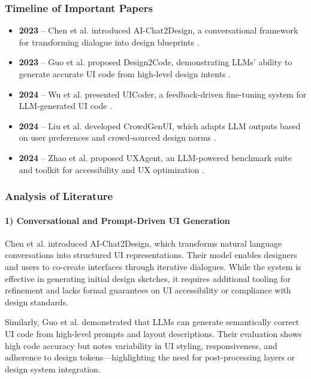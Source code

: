 \documentclass[12pt]{article}
\begin{document}
\subsubsection{Timeline of Important Papers}

\begin{itemize}
    \item \textbf{2023} – Chen et al. introduced AI-Chat2Design, a conversational framework for transforming dialogue into design blueprints \cite{chen2023aichat}.
    \item \textbf{2023} – Guo et al. proposed Design2Code, demonstrating LLMs' ability to generate accurate UI code from high-level design intents \cite{guo2023llmdesigntool}.
    \item \textbf{2024} – Wu et al. presented UICoder, a feedback-driven fine-tuning system for LLM-generated UI code \cite{wu2024uicoder}.
    \item \textbf{2024} – Liu et al. developed CrowdGenUI, which adapts LLM outputs based on user preferences and crowd-sourced design norms \cite{liu2024crowdgenui}.
    \item \textbf{2024} – Zhao et al. proposed UXAgent, an LLM-powered benchmark suite and toolkit for accessibility and UX optimization \cite{zhao2024uxagent}.
\end{itemize}

\subsubsection{Analysis of Literature}

\paragraph{1) Conversational and Prompt-Driven UI Generation}

Chen et al. \cite{chen2023aichat} introduced AI-Chat2Design, which transforms natural language conversations into structured UI representations. Their model enables designers and users to co-create interfaces through iterative dialogues. While the system is effective in generating initial design sketches, it requires additional tooling for refinement and lacks formal guarantees on UI accessibility or compliance with design standards.

Similarly, Guo et al. \cite{guo2023llmdesigntool} demonstrated that LLMs can generate semantically correct UI code from high-level prompts and layout descriptions. Their evaluation shows high code accuracy but notes variability in UI styling, responsiveness, and adherence to design tokens—highlighting the need for post-processing layers or design system integration.
\end{document}
